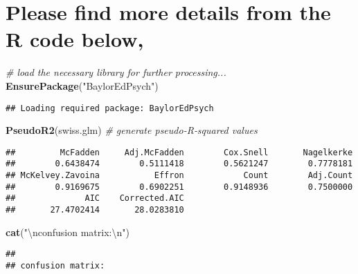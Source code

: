 \documentclass[]{article}
\newenvironment{Shaded}{\begin{snugshade}}{\end{snugshade}}
\newcommand{\CharTok}[1]{\textcolor[rgb]{0.31,0.60,0.02}{#1}}
\newcommand{\CommentTok}[1]{\textcolor[rgb]{0.56,0.35,0.01}{\textit{#1}}}
\newcommand{\DataTypeTok}[1]{\textcolor[rgb]{0.13,0.29,0.53}{#1}}
\newcommand{\KeywordTok}[1]{\textcolor[rgb]{0.13,0.29,0.53}{\textbf{#1}}}
\newcommand{\NormalTok}[1]{#1}
\newcommand{\OperatorTok}[1]{\textcolor[rgb]{0.81,0.36,0.00}{\textbf{#1}}}
\newcommand{\StringTok}[1]{\textcolor[rgb]{0.31,0.60,0.02}{#1}}
\begin{document}
\hypertarget{please-find-more-details-from-the-r-code-below-1}{%
\section{Please find more details from the R code
below,}\label{please-find-more-details-from-the-r-code-below-1}}

\begin{Shaded}
\begin{Highlighting}[]
\CommentTok{# load the necessary library for further processing...}
\KeywordTok{EnsurePackage}\NormalTok{(}\StringTok{"BaylorEdPsych"}\NormalTok{)}
\end{Highlighting}
\end{Shaded}

\begin{verbatim}
## Loading required package: BaylorEdPsych
\end{verbatim}

\begin{Shaded}
\begin{Highlighting}[]
\KeywordTok{PseudoR2}\NormalTok{(swiss.glm) }\CommentTok{# generate pseudo‐R‐squared values}
\end{Highlighting}
\end{Shaded}

\begin{verbatim}
##         McFadden     Adj.McFadden        Cox.Snell       Nagelkerke 
##        0.6438474        0.5111418        0.5621247        0.7778181 
## McKelvey.Zavoina           Effron            Count        Adj.Count 
##        0.9169675        0.6902251        0.9148936        0.7500000 
##              AIC    Corrected.AIC 
##       27.4702414       28.0283810
\end{verbatim}

\begin{Shaded}
\begin{Highlighting}[]
\KeywordTok{cat}\NormalTok{(}\StringTok{"}\CharTok{\textbackslash{}n}\StringTok{confusion matrix:}\CharTok{\textbackslash{}n}\StringTok{"}\NormalTok{)}
\end{Highlighting}
\end{Shaded}

\begin{verbatim}
## 
## confusion matrix:
\end{verbatim}

\begin{Shaded}
\end{Shaded}
\end{document}
